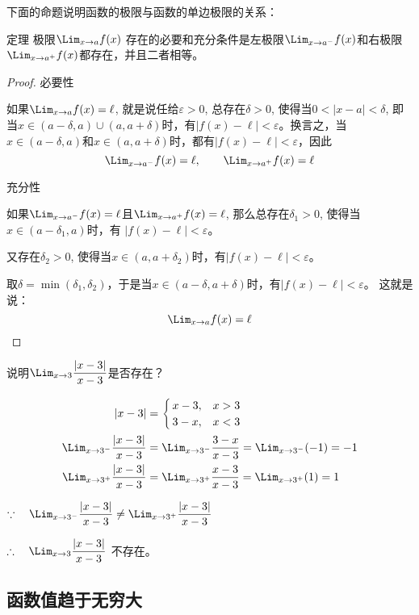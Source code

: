 下面的命题说明函数的极限与函数的单边极限的关系：

\begin{blk}{定理}
极限$\Lim_{x\to a} f(x)$
存在的必要和充分条件是左极限$\Lim_{x\to a^-} f(x)$和右极限$\Lim_{x\to a^+} f(x)$都存在，并且二者相等。
\end{blk}

\begin{proof}
    必要性
    
    如果$\Lim_{x\to a} f(x)=\ell$, 就是说任给$\varepsilon>0$, 总存在$\delta>0$,
使得当$0<|x-a|<\delta$, 即当$x\in (a-\delta,a)\cup(a,a+\delta)$时，有$|f(x)-\ell|<\varepsilon$。换言之，当$x\in (a-\delta,a)$和$x\in (a,a+\delta)$时，都有$|f (x) -\ell|<\varepsilon$，因此
\[\Lim_{x\to a^-} f(x)=\ell,\qquad \Lim_{x\to a^+} f(x)=\ell\]

充分性

如果$\Lim_{x\to a^-} f(x)=\ell$且$\Lim_{x\to a^+} f(x)=\ell$, 那么总存在$\delta_1>0$, 使得当$x\in(a-\delta_1,a)$时，有
$|f (x) -\ell|<\varepsilon$。

又存在$\delta_2>0$, 使得当$x\in (a,a+\delta_2)$时，有$|f (x) -\ell|<\varepsilon$。

取$\delta=\min(\delta_1,\delta_2)$，于是当$x\in(a-\delta,a+\delta)$时，有$|f (x) -\ell|<\varepsilon$。
这就是说：
\[\Lim_{x\to a} f(x)=\ell\]
\end{proof}

\begin{example}
说明$\Lim_{x\to 3}\frac{|x-3|}{x-3}$是否存在？
\end{example}

\begin{solution}
\[\begin{split}|x-3|&=\begin{cases}
    x-3, & x>3\\
    3-x, &x<3
\end{cases}\\
    \Lim_{x\to 3^-}\frac{|x-3|}{x-3}&=\Lim_{x\to 3^-}\frac{3-x}{x-3}=\Lim_{x\to 3^-}(-1)=-1\\
    \Lim_{x\to 3^+}\frac{|x-3|}{x-3}&=\Lim_{x\to 3^+}\frac{x-3}{x-3}=\Lim_{x\to 3^+}(1)=1
\end{split}\]

$\because\quad \Lim_{x\to 3^-}\frac{|x-3|}{x-3}\ne \Lim_{x\to 3^+}\frac{|x-3|}{x-3}$
    
$\therefore\quad \Lim_{x\to 3}\frac{|x-3|}{x-3}$
不存在。
\end{solution}

\subsection{函数值趋于无穷大}

